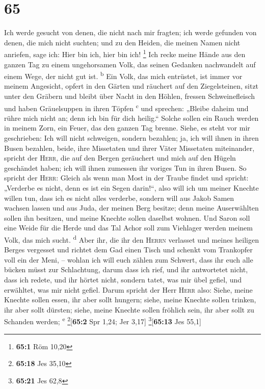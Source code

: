 \hypertarget{section-64}{%
\section{65}\label{section-64}}

 Ich werde gesucht von denen, die nicht nach mir fragten;
ich werde gefunden von denen, die mich nicht suchten; und zu den Heiden,
die meinen Namen nicht anriefen, sage ich: Hier bin ich, hier bin ich!
\footnote{\textbf{65:1} Röm 10,20}  Ich recke meine Hände
aus den ganzen Tag zu einem ungehorsamen Volk, das seinen Gedanken
nachwandelt auf einem Wege, der nicht gut ist. \textsuperscript{b}
 Ein Volk, das mich entrüstet, ist immer vor meinem
Angesicht, opfert in den Gärten und räuchert auf den Ziegelsteinen,
 sitzt unter den Gräbern und bleibt über Nacht in den
Höhlen, fressen Schweinefleisch und haben Gräuelsuppen in ihren Töpfen
\textsuperscript{c}  und sprechen: „Bleibe daheim und
rühre mich nicht an; denn ich bin für dich heilig.`` Solche sollen ein
Rauch werden in meinem Zorn, ein Feuer, das den ganzen Tag brenne.
 Siehe, es steht vor mir geschrieben: Ich will nicht
schweigen, sondern bezahlen; ja, ich will ihnen in ihren Busen bezahlen,
 beide, ihre Missetaten und ihrer Väter Missetaten
miteinander, spricht der \textsc{Herr}, die auf den Bergen geräuchert
und mich auf den Hügeln geschändet haben; ich will ihnen zumessen ihr
voriges Tun in ihren Busen.  So spricht der \textsc{Herr}:
Gleich als wenn man Most in der Traube findet und spricht: „Verderbe es
nicht, denn es ist ein Segen darin!{}``, also will ich um meiner Knechte
willen tun, dass ich es nicht alles verderbe,  sondern
will aus Jakob Samen wachsen lassen und aus Juda, der meinen Berg
besitze; denn meine Auserwählten sollen ihn besitzen, und meine Knechte
sollen daselbst wohnen.  Und Saron soll eine Weide für
die Herde und das Tal Achor soll zum Viehlager werden meinem Volk, das
mich sucht. \textsuperscript{d}  Aber ihr, die ihr den
\textsc{Herrn} verlasset und meines heiligen Berges vergesset und
richtet dem Gad einen Tisch und schenkt vom Trankopfer voll ein der
Meni, --  wohlan ich will euch zählen zum Schwert, dass
ihr euch alle bücken müsst zur Schlachtung, darum dass ich rief, und ihr
antwortetet nicht, dass ich redete, und ihr hörtet nicht, sondern tatet,
was mir übel gefiel, und erwähltet, was mir nicht gefiel.
 Darum spricht der Herr \textsc{Herr} also: Siehe, meine
Knechte sollen essen, ihr aber sollt hungern; siehe, meine Knechte
sollen trinken, ihr aber sollt dürsten; siehe, meine Knechte sollen
fröhlich sein, ihr aber sollt zu Schanden werden; \textsuperscript{e}
\footnote{\textbf{65:18} Jes 35,10}{[}\textbf{65:2} Spr 1,24; Jer
3,17{]} \footnote{\textbf{65:21} Jes 62,8}{[}\textbf{65:13} Jes 55,1{]}

